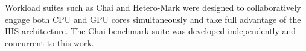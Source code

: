 \par Workload suites such as Chai \cite{chai} and Hetero-Mark \cite{hetero-mark} were designed to collaboratively engage both CPU and GPU cores simultaneously and take full advantage of the IHS architecture. The Chai benchmark suite was developed independently and concurrent to this work.
